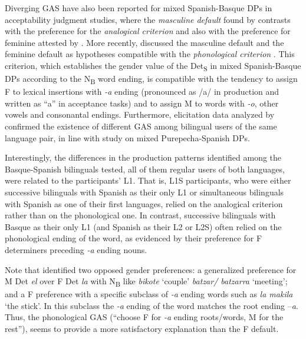 \documentclass[output=paper]{langscibook}
\begin{document}
Diverging GAS have also been reported for mixed Spanish-Basque DPs in acceptability judgment studies, where the \textit{masculine default} found by \citet{BadiolaSande2018} contrasts with the preference for the \textit{analogical criterion} \citep{Iriondo2017} and also with the preference for feminine attested by \citet{ParafitaCoutoEtAl2015basque}. More recently, \citet{Munarriz-IbarrolaEtAl2022} discussed the masculine default and the feminine default as hypotheses compatible with the \textit{phonological criterion} . This criterion, which establishes the gender value of the Det\textsubscript{S} in mixed Spanish-Basque DPs according to the N\textsubscript{B} word ending, is compatible with the tendency to assign F to lexical insertions with \textit{-a} ending (pronounced as /a/ in production and written as “a” in acceptance tasks) and to assign M to words with \textit{-o}, other vowels and consonantal endings. Furthermore, elicitation data analyzed by \citet{Munarriz-IbarrolaEtAl2022} confirmed the existence of different GAS among bilingual users of the same language pair, in line with  study on mixed Purepecha-Spanish DPs.

Interestingly, the differences in the production patterns identified among the Basque-Spanish bilinguals tested, all of them regular users of both languages, were related to the participants’ L1. That is, L1S participants, who were either successive bilinguals with Spanish as their only L1 or simultaneous bilinguals with Spanish as one of their first languages, relied on the analogical criterion rather than on the phonological one. In contrast, successive bilinguals with Basque as their only L1 (and Spanish as their L2 or L2S) often relied on the phonological ending of the word, as evidenced by their preference for F determiners preceding \textit{-a} ending nouns.

Note that \citet{BadiolaSande2018} identified two opposed gender preferences: a generalized preference for M Det \textit{el} over F Det \textit{la} with N\textsubscript{B} like \textit{bikote} ‘couple’ \textit{batzar/ batzarra} ‘meeting’; and a F preference with a specific subclass of \textit{-a} ending words such as \textit{la makila} ‘the stick’. In this subclass the \textit{-a} ending of the word matches the root ending –\textit{a}. Thus, the phonological GAS (“choose F for \textit{-a} ending roots/words, M for the rest”), seems to provide a more satisfactory explanation than the F default.
\end{document}
